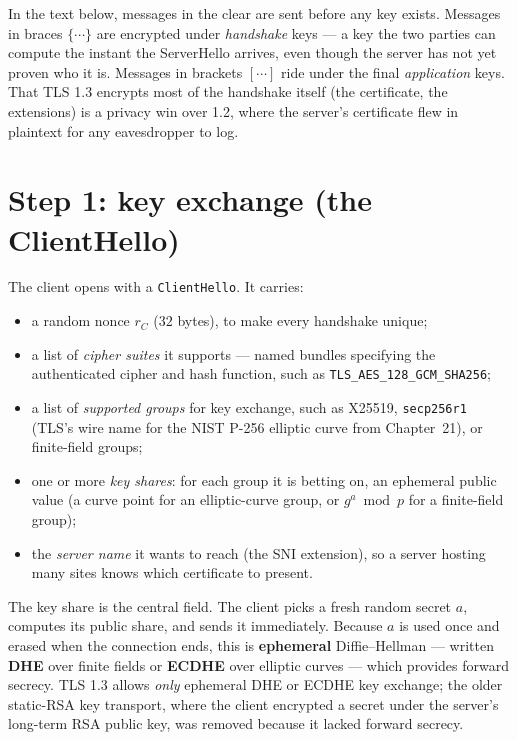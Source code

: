 In the text below, messages in the clear are sent before any key exists.
Messages in braces $\{\cdots\}$ are encrypted under \emph{handshake} keys --- a key
the two parties can compute the instant the ServerHello arrives, even though the
server has not yet proven who it is. Messages in brackets $[\cdots]$ ride under the
final \emph{application} keys. That TLS 1.3 encrypts most of the handshake itself
(the certificate, the extensions) is a privacy win over 1.2, where the server's
certificate flew in plaintext for any eavesdropper to log.

\section{Step 1: key exchange (the ClientHello)}

The client opens with a \texttt{ClientHello}. It carries:

\begin{itemize}
\item a random nonce $r_C$ ($32$ bytes), to make every handshake unique;
\item a list of \emph{cipher suites} it supports --- named bundles specifying the
authenticated cipher and hash function, such as \texttt{TLS\_AES\_128\_GCM\_SHA256};
\item a list of \emph{supported groups} for key exchange, such as X25519,
\texttt{secp256r1} (TLS's wire name for the NIST P-256 elliptic curve from Chapter~21),
or finite-field groups;
\item one or more \emph{key shares}: for each group it is betting on, an
ephemeral public value (a curve point for an elliptic-curve group, or $g^a \bmod p$
for a finite-field group);
\item the \emph{server name} it wants to reach (the SNI extension), so a server
hosting many sites knows which certificate to present.
\end{itemize}

The key share is the central field. The client picks a fresh random secret $a$,
computes its public share, and sends it immediately. Because $a$ is used once and
erased when the connection ends, this is \textbf{ephemeral} Diffie--Hellman ---
written \textbf{DHE} over finite fields or \textbf{ECDHE} over elliptic curves ---
which provides forward secrecy. TLS 1.3 allows \emph{only} ephemeral DHE or ECDHE
key exchange; the older static-RSA key transport, where the client encrypted a
secret under the server's long-term RSA public key, was removed because it lacked
forward secrecy.

